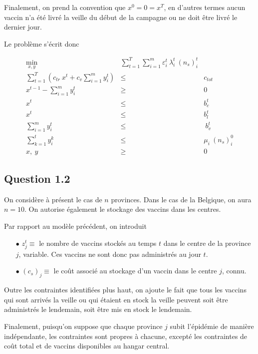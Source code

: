 \documentclass[a4paper,11pt]{report}
\begin{document}
Finalement, on prend la convention que $x^0 = 0 = x^T$, en d'autres termes aucun vaccin n'a été livré la veille du début de la campagne ou ne doit être livré le dernier jour.

Le problème s'écrit donc

\begin{eqnarray*}
\min_{x, y} & \sum_{t=1}^{T} \sum_{i=1}^{m}  \varepsilon_i^t\ \lambda_i^t\ (n_s)_i^t \\
\sum_{t=1}^T \left(c_{tr}\ x^t + c_v \sum_{i=1}^{m} y_i^t\right)  & \leq & c_{tot} \\
x^{t-1} - \sum_{i=1}^{m} y_i^t & \geq & 0\\
x^{t} &\leq & b_c^t \qquad\\  
x^t    &\leq & b_l^t \qquad \\
\sum_{i=1}^{m} y_i^t & \leq &\ b_v^t \\
\sum_{k=1}^t y_i^k & \leq & \mu_i\ (n_s)_i^0\\
x,\ y & \geq & 0
\end{eqnarray*}


%

\subsection{Question 1.2}


On considère à présent le cas de $n$ provinces. Dans le cas de la Belgique, on aura $n=10$.
On autorise également le stockage des vaccins dans les centres.

Par rapport au modèle précédent, on introduit 
\begin{itemize}
\item[$\bullet$] $z_j^t \equiv$ le nombre de vaccins stockés au temps $t$ dans le centre de la province $j$, variable. Ces vaccins ne sont donc pas administrés au jour $t$.
\item[$\bullet$] $(c_s)_j \equiv$ le coût associé au stockage d'un vaccin dans le centre $j$, connu.
\end{itemize}

Outre les contraintes identifiées plus haut, on ajoute le fait que tous les vaccins qui sont arrivés la veille ou qui étaient en stock la veille peuvent soit être administrés le lendemain, soit être mis en stock le lendemain.

Finalement, puisqu'on suppose que chaque province $j$ subit l'épidémie de manière indépendante, les contraintes sont propres à chacune, excepté les contraintes de coût total et de vaccins disponibles au hangar central.
\end{document}
